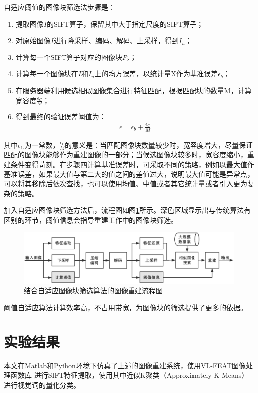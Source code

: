 \documentclass[UTF8]{csoarticle}
\begin{document}
自适应阈值的图像块筛选法步骤是：
\begin{enumerate}
\item 提取图像\(I\)的SIFT算子，保留其中大于指定尺度的SIFT算子；
\item 对原始图像\(I\)进行降采样、编码、解码、上采样，得到\(I_u\)；
\item 计算每一个SIFT算子对应的图像块\(P_S\)；
\item 计算每一个图像块在\(I\)和\(I_u\)上的均方误差，以统计量X作为基准误差\(\epsilon_b\)；
\item 在服务器端利用候选相似图像集合进行特征匹配，根据匹配块的数量M，计算宽容度\(\frac{\epsilon_C}{M}\)；
\item 得到最终的验证误差阈值为：
\begin{align}
\epsilon = \epsilon_b + \frac{\epsilon_C}{M}
\end{align}
\end{enumerate}

其中\(\epsilon_C\)为一常数，\(\frac{\epsilon_C}{M}\)的意义是：当匹配图像块数量较少时，宽容度增大，尽量保证匹配的图像块能够作为重建图像的一部分；当候选图像块较多时，宽容度缩小，重建条件变得苛刻。在步骤四计算基准误差时，可采取不同的策略，例如以最大值作基准误差，如果最大值与第二大的值之间的差值过大，说明最大值可能是异常点，可以将其移除后依次查找，也可以使用均值、中值或者其它统计量或者引入更为复杂的策略。

加入自适应图像块筛选方法后，流程图如图\ref{fig:flow2}所示。深色区域显示出与传统算法有区别的环节，阈值信息会指导重建工作中的图像块筛选。
\begin{figure}
\centering\includegraphics[width=15cm]{flowchart2}
\caption{结合自适应图像块筛选算法的图像重建流程图}
\label{fig:flow2}
\end{figure}
阈值自适应算法计算效率高，不占用带宽，为图像块的筛选提供了更多的依据。

\section{实验结果}
本文在Matlab和Python环境下仿真了上述的图像重建系统，使用VL-FEAT图像处理函数库
进行SIFT特征提取，使用其中近似K聚类（Approximately K-Means）进行视觉词的量化分类。
\end{document}
